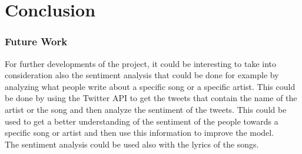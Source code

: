 \chapter{Conclusion}



\subsection{Future Work}
For further developments of the project, it could be interesting to take into consideration also the sentiment analysis that could be done for example by analyzing what people write about a specific song or a specific artist. This could be done by using the Twitter API to get the tweets that contain the name of the artist or the song and then analyze the sentiment of the tweets. This could be used to get a better understanding of the sentiment of the people towards a specific song or artist and then use this information to improve the model.\\
The sentiment analysis could be used also with the lyrics of the songs. 